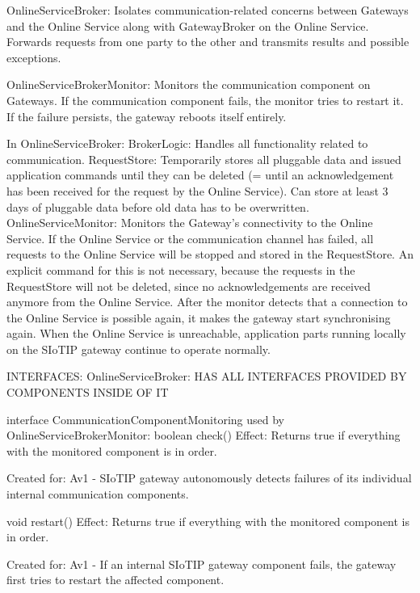         OnlineServiceBroker: Isolates communication-related concerns between Gateways and the Online Service along with GatewayBroker on the Online Service.
                             Forwards requests from one party to the other and transmits results and possible exceptions.

        OnlineServiceBrokerMonitor: Monitors the communication component on Gateways. If the communication component fails, the monitor
                                    tries to restart it. If the failure persists, the gateway reboots itself entirely.

        In OnlineServiceBroker:
            BrokerLogic: Handles all functionality related to communication.
            RequestStore: Temporarily stores all pluggable data and issued application commands until they can be deleted (= until an acknowledgement has been received for the request by the Online Service). Can store at least 3 days of pluggable data before old data has to be overwritten.
            OnlineServiceMonitor: Monitors the Gateway's connectivity to the Online Service. If the Online Service or the communication channel has failed, all requests to the Online Service will be stopped and stored in the RequestStore. An explicit command for this is not necessary,
                                  because the requests in the RequestStore will not be deleted, since no acknowledgements are received anymore from the Online Service. After the monitor detects that a connection to the Online Service is possible again, it makes the gateway start
                                  synchronising again. When the Online Service is unreachable, application parts running locally on the SIoTIP gateway continue to operate normally.

        INTERFACES:
            OnlineServiceBroker:
                HAS ALL INTERFACES PROVIDED BY COMPONENTS INSIDE OF IT

                interface CommunicationComponentMonitoring used by OnlineServiceBrokerMonitor:
                    boolean check()
                        Effect: Returns true if everything with the monitored component is in order.
                        \item Created for: Av1 - SIoTIP gateway autonomously detects failures of its individual internal communication components.

                    void restart()
                        Effect: Returns true if everything with the monitored component is in order.
                        \item Created for: Av1 - If an internal SIoTIP gateway component fails, the gateway first tries to restart the affected component.


